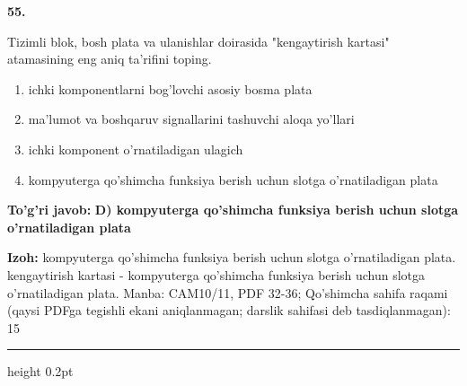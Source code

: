 \documentclass[10pt,a4paper]{article}
\begin{document}
{\bfseries\sffamily\color{ink} 55.}
\par
Tizimli blok, bosh plata va ulanishlar doirasida "kengaytirish kartasi" atamasining eng aniq ta'rifini toping.
\begin{enumerate}[label=\Alph*),leftmargin=9mm]
\item ichki komponentlarni bog'lovchi asosiy bosma plata
\item ma'lumot va boshqaruv signallarini tashuvchi aloqa yo'llari
\item ichki komponent o'rnatiladigan ulagich
\item kompyuterga qo'shimcha funksiya berish uchun slotga o'rnatiladigan plata
\end{enumerate}
\begin{tcolorbox}[enhanced,breakable,colback=teal!4,colframe=teal!60!black,boxrule=0.45pt,arc=1.2mm,left=2.7mm,right=2.7mm,top=1.8mm,bottom=1.8mm,before skip=2mm,after skip=2mm]
{\bfseries\sffamily\color{teal}To'g'ri javob:} \textbf{D) kompyuterga qo'shimcha funksiya berish uchun slotga o'rnatiladigan plata}
\par\smallskip
{\bfseries Izoh:} kompyuterga qo'shimcha funksiya berish uchun slotga o'rnatiladigan plata. kengaytirish kartasi - kompyuterga qo'shimcha funksiya berish uchun slotga o'rnatiladigan plata. Manba: CAM10/11, PDF 32-36; Qo'shimcha sahifa raqami (qaysi PDFga tegishli ekani aniqlanmagan; darslik sahifasi deb tasdiqlanmagan): 15
\end{tcolorbox}
\vspace{2mm}\hrule height 0.2pt\vspace{3mm}
\end{document}
